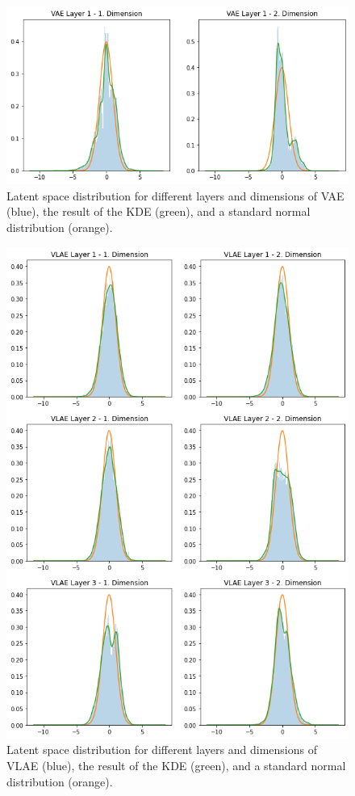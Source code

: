 \documentclass[11pt]{article}
\begin{document}
\begin{figure}[H]
\centering
\includegraphics[width=.8\textwidth]{images/generated_vs_true/vae_kde.png}
\caption[\ac{VAE} Estimated Latent Space Distribution]{Latent space distribution for different layers and dimensions of \ac{VAE} (blue), the result of the \ac{KDE} (green), and a standard normal distribution (orange).}
\end{figure}

\begin{figure}[H]
\centering
\includegraphics[width=.8\textwidth]{images/generated_vs_true/vlae_kde.png}
\caption[\ac{VLAE} Estimated Latent Space Distribution]{Latent space distribution for different layers and dimensions of \ac{VLAE} (blue), the result of the \ac{KDE} (green), and a standard normal distribution (orange).}
\end{figure}
\end{document}
